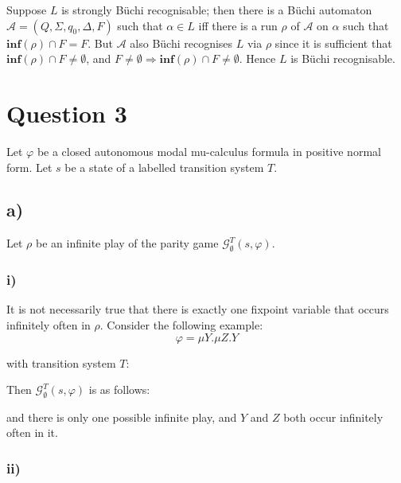\documentclass[11pt]{article}
\begin{document}
Suppose $L$ is strongly B\"uchi recognisable; then there is a B\"uchi automaton
$\mathcal{A} = (Q, \Sigma, q_0, \Delta, F)$ such that $\alpha \in L $ iff
there is a run $\rho$ of $\mathcal{A}$ on $\alpha$ such that
$\textbf{inf}(\rho) \cap F = F$. But $\mathcal{A}$ also B\"uchi recognises $L$
via $\rho$ since it is sufficient that $\textbf{inf}(\rho) \cap F \neq
\emptyset$, and $F \neq \emptyset \Rightarrow \textbf{inf}(\rho) \cap F \neq
\emptyset$. Hence $L$ is B\"uchi recognisable.

\section*{Question 3}

Let $\varphi$ be a closed autonomous modal mu-calculus formula in positive normal form. Let $s$ be a state of a labelled transition system $T$.

\subsection*{a)}

Let $\rho$ be an infinite play of the parity game $\mathcal{G}^{T}_{\emptyset}(s, \varphi)$.

\subsubsection*{i)}
It is not necessarily true that there is exactly one fixpoint variable that occurs infinitely often in $\rho$. Consider the following example: 
\begin{displaymath}
\varphi = \mu Y . \mu Z . Y
\end{displaymath}

with transition system $T$:


Then $\mathcal{G}^{T}_{\emptyset}(s, \varphi)$ is as follows:


and there is only one possible infinite play, and $Y$ and $Z$ both occur
infinitely often in it.

\subsubsection*{ii)}
\end{document}

